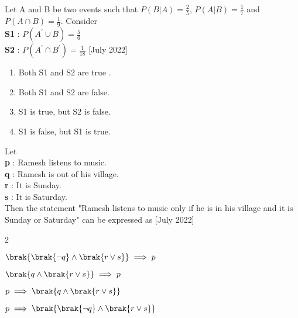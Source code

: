 	\item Let A and B be two events such that $P(B|A) = \frac{2}{5}$, $P(A|B) = \frac{1}{7}$ and $P(A \cap B) = \frac{1}{9}$. Consider \\
		\textbf{S1} : $P(A^{\prime} \cup B) = \frac{5}{6} $ \\
		\textbf{S2} : $P(A^{\prime} \cap B^{\prime}) = \frac{1}{18} $    \hfill{[July 2022]}
		\begin{enumerate}
			\item Both S1 and S2 are true .
			\item Both S1 and S2 are false.
			\item S1 is true, but S2 is false.
			\item S1 is false, but S1 is true.
		\end{enumerate}
	\item Let \\
		\textbf{p} : Ramesh listens to music. \\
		\textbf{q} : Ramesh is out of his village. \\
		\textbf{r} : It is Sunday. \\
		\textbf{s} : It is Saturday. \\
		Then the statement "Ramesh listens to music only if he is in his village and it is Sunday or Saturday" can be expressed as \hfill{[July 2022]}
		\begin{enumerate}
		\end{enumerate}
%
